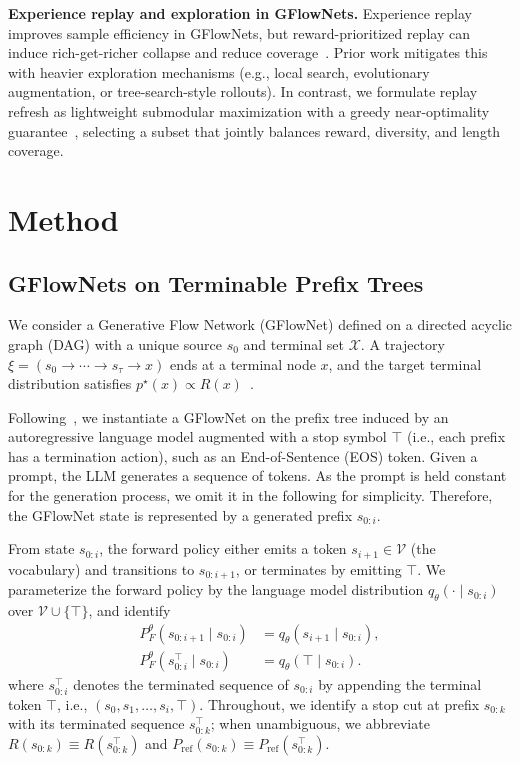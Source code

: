 \documentclass{article}
\theoremstyle{plain}
\theoremstyle{definition}
\theoremstyle{remark}
\begin{document}
\textbf{Experience replay and exploration in GFlowNets.}
Experience replay improves sample efficiency in GFlowNets, but reward-prioritized replay can induce rich-get-richer collapse and reduce coverage~\citep{pmlr-v202-shen23a,vemgal2023an,hu2024amortizing}. Prior work mitigates this with heavier exploration mechanisms (e.g., local search, evolutionary augmentation, or tree-search-style rollouts). In contrast, we formulate replay refresh as lightweight submodular maximization with a greedy near-optimality guarantee~\citep{subM_bg1,subM_bg2,subM_bg3}, selecting a subset that jointly balances reward, diversity, and length coverage.
\section{Method}
\label{sec:method}

\subsection{GFlowNets on Terminable Prefix Trees}
\label{method:gfn-llm}
We consider a Generative Flow Network (GFlowNet) defined on a directed acyclic graph (DAG) with a unique source $s_0$ and terminal set $\mathcal{X}$.
A trajectory $\xi = (s_0 \to \cdots \to s_{\tau} \to x)$ ends at a terminal node $x$, and the target terminal distribution satisfies
$p^\star(x) \propto R(x)$~\citep{bengio2021flow,bengio2023gflownet}.

Following~\citet{hu2024amortizing}, we instantiate a GFlowNet on the prefix tree induced by an autoregressive language model augmented with a stop symbol $\top$ (i.e., each prefix has a termination action), such as an End-of-Sentence (EOS) token.
Given a prompt, the LLM generates a sequence of tokens. As the prompt is held constant for the generation process, we omit it in the following for simplicity.
Therefore, the GFlowNet state is represented by a generated prefix $s_{0:i}$.

From state $s_{0:i}$, the forward policy either emits a token $s_{i+1}\in\mathcal{V}$ (the vocabulary) and transitions to $s_{0:i+1}$, or terminates by emitting $\top$.
We parameterize the forward policy by the language model distribution $q_\theta(\cdot\mid s_{0:i})$ over $\mathcal{V}\cup\{\top\}$, and identify
\[
\begin{aligned}
P_F^\theta(s_{0:i+1}\mid s_{0:i}) &= q_\theta(s_{i+1}\mid s_{0:i}), \\
P_F^\theta(s_{0:i}^\top\mid s_{0:i}) &= q_\theta(\top\mid s_{0:i}).
\end{aligned}
\]
where $s_{0:i}^{\top}$ denotes the terminated sequence of $s_{0:i}$ by appending the terminal token $\top$, i.e., $(s_0, s_1, \ldots,s_i,\top)$. Throughout, we identify a stop cut at prefix $s_{0:k}$ with its terminated sequence $s_{0:k}^{\top}$; when unambiguous, we abbreviate $R(s_{0:k})\equiv R(s_{0:k}^{\top})$ and $P_{\mathrm{ref}}(s_{0:k})\equiv P_{\mathrm{ref}}(s_{0:k}^{\top})$.
\end{document}
